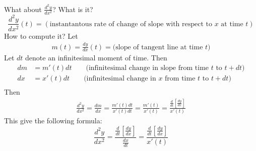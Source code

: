 \documentclass[10pt]{article}
\theoremstyle{definition}
\newcommand{\1}[1]{\textbf{1}_{\left[#1\right]}} %
\begin{document}
What about $\frac{d^{2}y}{dx^{2}}$? What is it?
\begin{equation*}
  \frac{d^{2}y}{dx^{2}}(t) = \left( \text{instantantous rate of change of slope
      with respect to $x$ at time $t$} \right)
\end{equation*}
How to compute it? Let
\begin{align*}
  m(t) = \frac{dy}{dx}(t) = \text{(slope of tangent line at time $t$)}
\end{align*}
Let $dt$ denote an infinitesimal moment of time. Then
\begin{align*}
  dm &= m'(t)dt \qquad \text{(infinitesimal change in slope from time $t$ to $t+dt$)}\\
  dx &= x'(t)dt \qquad \text{(infinitesimal change in $x$ from time $t$ to $t+dt$)}\\
\end{align*}
Then
\begin{align*}
  \frac{d^{2}y}{dx^{2}}
  = \frac{dm}{dx}
  = \frac{m'(t)dt}{x'(t)dt}
  = \frac{m'(t)}{x'(t)}
  = \frac{\frac{d}{dt}\left[ \frac{dy}{dx} \right] }{x'(t)}
\end{align*}
This give the following formula:
\begin{equation}\label{eq:2nd-derivative-for-parameterized-curves}
  \frac{d^{2}y}{dx^{2}} = \frac{\frac{d}{dt}\left[ \frac{dy}{dx} \right] }{\frac{dx}{dt}}= \frac{\frac{d}{dt}\left[ \frac{dy}{dx} \right] }{x'(t)}
\end{equation}
\end{document}
